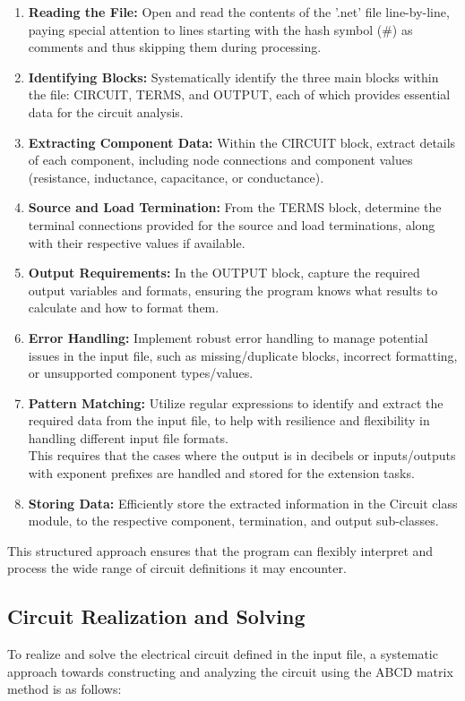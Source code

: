 \documentclass[a4paper]{article}
\begin{document}
\begin{enumerate}
    \item \textbf{Reading the File:} Open and read the contents of the '.net' file line-by-line, paying special attention to lines starting with the hash symbol (\#) as comments and thus skipping them during processing.
    \item \textbf{Identifying Blocks:} Systematically identify the three main blocks within the file: CIRCUIT, TERMS, and OUTPUT, each of which provides essential data for the circuit analysis.
    \item \textbf{Extracting Component Data:} Within the CIRCUIT block, extract details of each component, including node connections and component values (resistance, inductance, capacitance, or conductance).
    \item \textbf{Source and Load Termination:} From the TERMS block, determine the terminal connections provided for the source and load terminations, along with their respective values if available.
    \item \textbf{Output Requirements:} In the OUTPUT block, capture the required output variables and formats, ensuring the program knows what results to calculate and how to format them.
    \item \textbf{Error Handling:} Implement robust error handling to manage potential issues in the input file, such as missing/duplicate blocks, incorrect formatting, or unsupported component types/values.
    \item \textbf{Pattern Matching:} Utilize regular expressions to identify and extract the required data from the input file, to help with resilience and flexibility in handling different input file formats.\\
    This requires that the cases where the output is in decibels or inputs/outputs with exponent prefixes are handled and stored for the extension tasks.
    \item \textbf{Storing Data:} Efficiently store the extracted information in the Circuit class module, to the respective component, termination, and output sub-classes.
\end{enumerate}

This structured approach ensures that the program can flexibly interpret and process the wide range of circuit definitions it may encounter.

\subsection*{Circuit Realization and Solving}
To realize and solve the electrical circuit defined in the input file, a systematic approach towards constructing and analyzing the circuit using the ABCD matrix method is as follows:
\end{document}
